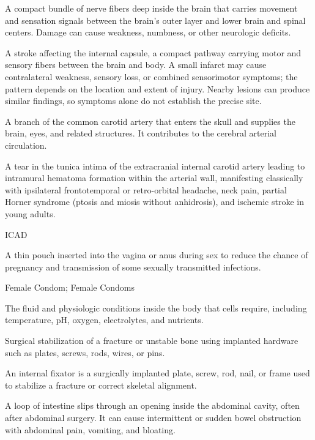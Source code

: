  A compact bundle of nerve fibers deep inside the brain that carries movement and sensation signals between the brain’s outer layer and lower brain and spinal centers. Damage can cause weakness, numbness, or other neurologic deficits.

 A stroke affecting the internal capsule, a compact pathway
carrying motor and sensory fibers between the brain and body. A small infarct may cause
contralateral weakness, sensory loss, or combined sensorimotor symptoms; the pattern depends
on the location and extent of injury. Nearby lesions can produce similar findings, so
symptoms alone do not establish the precise site.

 A branch of the common carotid artery that enters the skull and supplies the brain, eyes, and related structures. It contributes to the cerebral arterial circulation.

 A tear in the tunica intima of the extracranial internal carotid artery leading to intramural hematoma formation within the arterial wall, manifesting classically with ipsilateral frontotemporal or retro-orbital headache, neck pain, partial Horner syndrome (ptosis and miosis without anhidrosis), and ischemic stroke in young adults.

\synonyms
ICAD

 A thin pouch inserted into the vagina or anus during sex to reduce the chance of pregnancy and transmission of some sexually transmitted infections.

\synonyms
Female Condom; Female Condoms

 The fluid and physiologic conditions inside the body that cells require, including temperature, pH, oxygen, electrolytes, and nutrients.

 Surgical stabilization of a fracture or unstable bone using implanted hardware such as plates, screws, rods, wires, or pins.

 An internal fixator is a surgically implanted plate, screw, rod, nail, or frame used to stabilize a fracture or correct skeletal alignment.

 A loop of intestine slips through an opening inside the abdominal cavity, often after abdominal surgery. It can cause intermittent or sudden bowel obstruction with abdominal pain, vomiting, and bloating.

